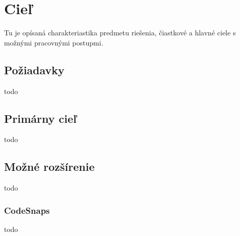 \chapter{Cieľ}

\label{kap:ciel}

Tu je opísaná charakteriastika predmetu riešenia, čiastkové a hlavné ciele s možnými pracovnými postupmi.

\section{Požiadavky}
todo

\section{Primárny cieľ}
todo

\section{Možné rozšírenie}
todo

\subsection{CodeSnaps}
todo